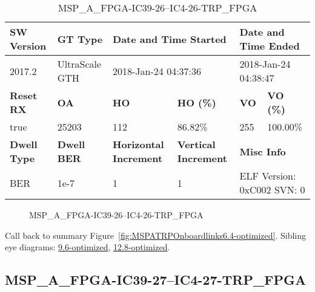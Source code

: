 \begin{table}[h]
\centering
\caption{MSP\_A\_FPGA-IC39-26--IC4-26-TRP\_FPGA}
\label{tab:MSPAFPGAIC3926IC426TRPFPGA6.4-optimized}
\begin{tabular}{@{}|l|l|l|l|l|l|@{}}
\toprule
\textbf{SW Version}                & \textbf{GT Type}   & \multicolumn{2}{l|}{\textbf{Date and Time Started}}            & \multicolumn{2}{l|}{\textbf{Date and Time Ended}}        \\ \midrule
2017.2                       & UltraScale GTH          & \multicolumn{2}{l|}{2018-Jan-24 04:37:36}                   & \multicolumn{2}{l|}{2018-Jan-24 04:38:47}               \\ \midrule
\textbf{Reset RX}                  & \textbf{OA} & \textbf{HO}   & \textbf{HO (\%)} & \textbf{VO} & \textbf{VO (\%)} \\ \midrule
true & 25203        & 112          & 86.82\%        & 255        & 100.00\%       \\ \midrule
\textbf{Dwell Type}                & \textbf{Dwell BER} & \textbf{Horizontal Increment} & \textbf{Vertical Increment}    & \multicolumn{2}{l|}{\textbf{Misc Info}}                  \\ \midrule
BER                            & 1e-7        & 1        & 1           & \multicolumn{2}{l|}{ELF Version: 0xC002 SVN: 0}                         \\ \bottomrule
\end{tabular}
\end{table}

\begin{figure}[h]
\caption{MSP\_A\_FPGA-IC39-26--IC4-26-TRP\_FPGA} \label{fig:MSPAFPGAIC3926IC426TRPFPGA6.4-optimized}
\end{figure}

Call back to summary Figure~\ref{fig:MSPATRPOnboardlinks6.4-optimized}.
Sibling eye diagrams: \hyperref[sec:MSPAFPGAIC3926IC426TRPFPGA9.6-optimized]{9.6-optimized}, \hyperref[sec:MSPAFPGAIC3926IC426TRPFPGA12.8-optimized]{12.8-optimized}.

\clearpage
\newpage


\subsection{MSP\_A\_FPGA-IC39-27--IC4-27-TRP\_FPGA}\label{sec:MSPAFPGAIC3927IC427TRPFPGA6.4-optimized}

